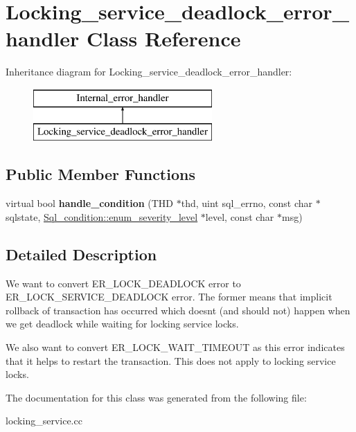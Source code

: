 \hypertarget{classLocking__service__deadlock__error__handler}{}\section{Locking\+\_\+service\+\_\+deadlock\+\_\+error\+\_\+handler Class Reference}
\label{classLocking__service__deadlock__error__handler}
Inheritance diagram for Locking\+\_\+service\+\_\+deadlock\+\_\+error\+\_\+handler\+:\begin{figure}[H]
\begin{center}
\leavevmode
\includegraphics[height=2.000000cm]{classLocking__service__deadlock__error__handler}
\end{center}
\end{figure}
\subsection*{Public Member Functions}
\begin{DoxyCompactItemize}
\item 
\mbox{\label{classLocking__service__deadlock__error__handler_a5bbbd2a5021c16e9dab58bf99904d6cf}} 
virtual bool {\bfseries handle\+\_\+condition} (T\+HD $\ast$thd, uint sql\+\_\+errno, const char $\ast$sqlstate, \mbox{\hyperlink{classSql__condition_ab0602581e19cddb609bfe10c44be4e83}{Sql\+\_\+condition\+::enum\+\_\+severity\+\_\+level}} $\ast$level, const char $\ast$msg)
\end{DoxyCompactItemize}


\subsection{Detailed Description}
We want to convert E\+R\+\_\+\+L\+O\+C\+K\+\_\+\+D\+E\+A\+D\+L\+O\+CK error to E\+R\+\_\+\+L\+O\+C\+K\+\_\+\+S\+E\+R\+V\+I\+C\+E\+\_\+\+D\+E\+A\+D\+L\+O\+CK error. The former means that implicit rollback of transaction has occurred which doesn\textquotesingle{}t (and should not) happen when we get deadlock while waiting for locking service locks.

We also want to convert E\+R\+\_\+\+L\+O\+C\+K\+\_\+\+W\+A\+I\+T\+\_\+\+T\+I\+M\+E\+O\+UT as this error indicates that it helps to restart the transaction. This does not apply to locking service locks. 

The documentation for this class was generated from the following file\+:\begin{DoxyCompactItemize}
\item 
locking\+\_\+service.\+cc\end{DoxyCompactItemize}
